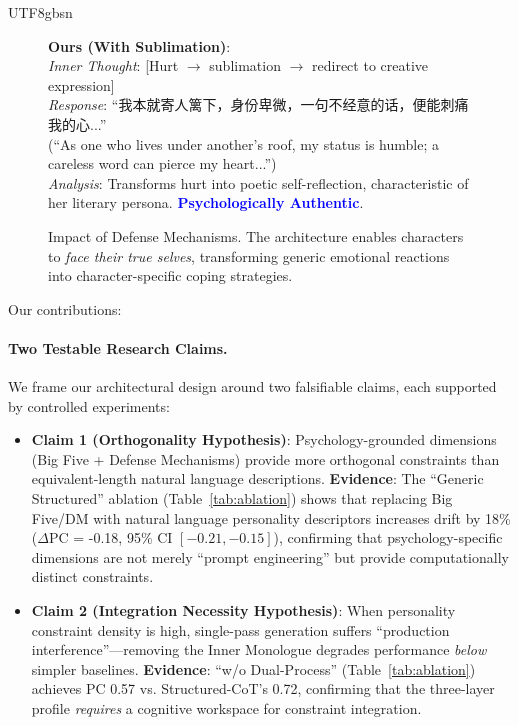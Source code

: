 \documentclass[11pt]{article}
\begin{document}
\begin{CJK*}{UTF8}{gbsn}
\begin{figure}[t]
\begin{tcolorbox}[colback=gray!10, colframe=black!70, title=\textbf{Case Study: Psychological Defense Mechanism}]
\medskip
\textbf{Ours (With Sublimation)}: \\
\textit{Inner Thought}: [Hurt $\rightarrow$ sublimation $\rightarrow$ redirect to creative expression] \\
\textit{Response}: ``我本就寄人篱下，身份卑微，一句不经意的话，便能刺痛我的心...'' \\
(``As one who lives under another's roof, my status is humble; a careless word can pierce my heart...'') \\
\textit{Analysis}: Transforms hurt into poetic self-reflection, characteristic of her literary persona. \textcolor{blue}{\textbf{Psychologically Authentic}}.
\end{tcolorbox}
\caption{Impact of Defense Mechanisms. The architecture enables characters to \textit{face their true selves}, transforming generic emotional reactions into character-specific coping strategies.}
\label{fig:motivating}
\end{figure}

Our contributions:

\paragraph{Two Testable Research Claims.} We frame our architectural design around two falsifiable claims, each supported by controlled experiments:

\begin{itemize}
    \item \textbf{Claim 1 (Orthogonality Hypothesis)}: Psychology-grounded dimensions (Big Five + Defense Mechanisms) provide more orthogonal constraints than equivalent-length natural language descriptions. \textbf{Evidence}: The ``Generic Structured'' ablation (Table~\ref{tab:ablation}) shows that replacing Big Five/DM with natural language personality descriptors increases drift by 18\% ($\Delta$PC = -0.18, 95\% CI $[-0.21, -0.15]$), confirming that psychology-specific dimensions are not merely ``prompt engineering'' but provide computationally distinct constraints.
    \item \textbf{Claim 2 (Integration Necessity Hypothesis)}: When personality constraint density is high, single-pass generation suffers ``production interference''---removing the Inner Monologue degrades performance \textit{below} simpler baselines. \textbf{Evidence}: ``w/o Dual-Process'' (Table~\ref{tab:ablation}) achieves PC 0.57 vs. Structured-CoT's 0.72, confirming that the three-layer profile \textit{requires} a cognitive workspace for constraint integration.
\end{itemize}


\end{CJK*}
\end{document}
